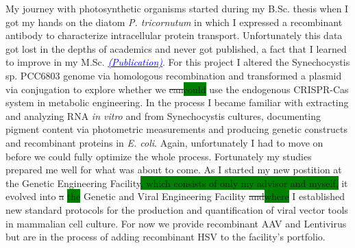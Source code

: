 \documentclass[11pt,a4paper,sans]{moderncv}
\begin{document}
\begin{spacing}{1.15}
My journey with photosynthetic organisms started during my B.Sc. thesis when I got my hands on the diatom \textit{P. tricornutum} in which I expressed a recombinant antibody to characterize intracellular protein transport. %
Unfortunately this data got lost in the depths of academics and never got published, a fact that I learned to improve in my M.Sc. {\href{https://www.ncbi.nlm.nih.gov/pubmed/29517395}{\textcolor{blue}{{\textit{(Publication)}}}}}. %
For this project I altered the Synechocystis sp. PCC6803 genome via homologous recombination and transformed a plasmid via conjugation to explore whether we \sout{can}\colorbox{green}{could} use the endogenous CRISPR-Cas system in metabolic engineering. 
In the process I became familiar with extracting and analyzing RNA \textit{in vitro} and from Synechocystis cultures, documenting pigment content via photometric measurements and producing genetic constructs and recombinant proteins in \textit{E. coli}. 
Again, unfortunately I had to move on before we could fully optimize the whole process. %
Fortunately my studies prepared me well for what was about to come. %
As I started my new postition at the Genetic Engineering Facility\colorbox{green}{, which consists of only my advisor and myself,} it evolved into \sout{a} \colorbox{green}{the} Genetic and Viral Engineering Facility \sout{and}\colorbox{green}{where} I established new standard protocols for the production and quantification of viral vector tools in mammalian cell culture. For now we provide recombinant AAV and Lentivirus but are in the process of adding recombinant HSV to the facility's portfolio.\par


\end{spacing}
\end{document}
